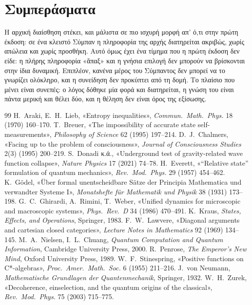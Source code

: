 \documentclass[a4paper,11pt]{article}
\theoremstyle{definition}
\begin{document}
\section{Συμπεράσματα}

Η αρχική διαίσθηση στέκει, και μάλιστα σε πιο ισχυρή μορφή απ' ό,τι στην πρώτη έκδοση: σε ένα κλειστό Σύμπαν η πληροφορία της αρχής διατηρείται ακριβώς, χωρίς απώλεια και χωρίς προσθήκη. Αυτό όμως έχει ένα τίμημα που η πρώτη έκδοση δεν είδε: η πλήρης πληροφορία «ἅπαξ» και η γνήσια επιλογή δεν μπορούν να βρίσκονται στην ίδια δυναμική. Επιπλέον, κανένα μέρος του Σύμπαντος δεν μπορεί να το γνωρίζει ολόκληρο, και η συνείδηση δεν προκύπτει από τη δομή. Το πλαίσιο που μένει είναι συνεπές: ο λόγος δόθηκε μία φορά και διατηρείται, η γνώση του είναι πάντα μερική και θέλει δύο, και η θέληση δεν είναι όρος της εξίσωσης.

\begin{thebibliography}{99}
 H.~Araki, E.~H.~Lieb, «Entropy inequalities», \emph{Commun.\ Math.\ Phys.} 18 (1970) 160--170.
 T.~Breuer, «The impossibility of accurate state self-measurements», \emph{Philosophy of Science} 62 (1995) 197--214.
 D.~J.~Chalmers, «Facing up to the problem of consciousness», \emph{Journal of Consciousness Studies} 2(3) (1995) 200--219.
 S.~Donadi κ.ά., «Underground test of gravity-related wave function collapse», \emph{Nature Physics} 17 (2021) 74--78.
 H.~Everett, «“Relative state” formulation of quantum mechanics», \emph{Rev.\ Mod.\ Phys.} 29 (1957) 454--462.
 K.~Gödel, «Über formal unentscheidbare Sätze der Principia Mathematica und verwandter Systeme I», \emph{Monatshefte für Mathematik und Physik} 38 (1931) 173--198.
 G.~C.~Ghirardi, A.~Rimini, T.~Weber, «Unified dynamics for microscopic and macroscopic systems», \emph{Phys.\ Rev.\ D} 34 (1986) 470--491.
 K.~Kraus, \emph{States, Effects, and Operations}, Springer, 1983.
 F.~W.~Lawvere, «Diagonal arguments and cartesian closed categories», \emph{Lecture Notes in Mathematics} 92 (1969) 134--145.
 M.~A.~Nielsen, I.~L.~Chuang, \emph{Quantum Computation and Quantum Information}, Cambridge University Press, 2000.
 R.~Penrose, \emph{The Emperor's New Mind}, Oxford University Press, 1989.
 W.~F.~Stinespring, «Positive functions on C*-algebras», \emph{Proc.\ Amer.\ Math.\ Soc.} 6 (1955) 211--216.
 J.~von Neumann, \emph{Mathematische Grundlagen der Quantenmechanik}, Springer, 1932.
 W.~H.~Zurek, «Decoherence, einselection, and the quantum origins of the classical», \emph{Rev.\ Mod.\ Phys.} 75 (2003) 715--775.
\end{thebibliography}
\end{document}
